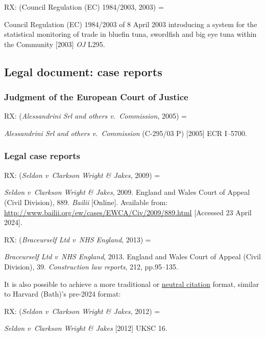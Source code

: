RX: (Council Regulation (EC) 1984/2003, 2003) = \cite{eu.dir1984/2003}

Council Regulation (EC) 1984/2003 of 8 April 2003 introducing a system for the statistical monitoring of trade in bluefin tuna, swordfish and big eye tuna within the Community [2003] \emph{OJ} L295.



\subsection{Legal document: case reports}

\subsubsection*{Judgment of the European Court of Justice}

RX: (\emph{Alessandrini Srl and others v.~Commission}, 2005) = \cite{srl.etal-v-comm2005}

\emph{Alessandrini Srl and others v.~Commission} (C-295/03 P) [2005] ECR I--5700.



\subsubsection*{Legal case reports}

RX: (\emph{Seldon v~Clarkson Wright \& Jakes}, 2009) = \cite{seldon-v-c.w.j2009}

\emph{Seldon v~Clarkson Wright \& Jakes}, 2009. England and Wales Court of Appeal (Civil Division), 889. \emph{Bailii} [Online]. Available from: \url{http://www.bailii.org/ew/cases/EWCA/Civ/2009/889.html} [Accessed 23 April 2024].


RX: (\emph{Braceurself Ltd v~NHS England}, 2013) = \cite{braceurself-v-nhs.england2013}

\emph{Braceurself Ltd v~NHS England}, 2013. England and Wales Court of Appeal (Civil Division), 39. \emph{Construction law reports}, 212, pp.95--135.


It is also possible to achieve a more traditional or
\href{http://www.bailii.org/bailii/citation.html}{neutral citation} format,
similar to Harvard (Bath)'s pre-2024 format:

RX: (\emph{Seldon v~Clarkson Wright \& Jakes}, 2012) = \cite{seldon-v-c.w.j2012}

\emph{Seldon v~Clarkson Wright \& Jakes} [2012] UKSC 16.




